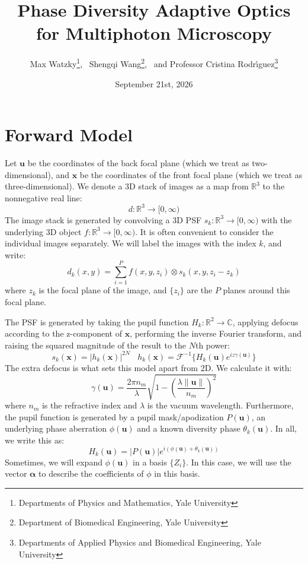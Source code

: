 \documentclass{article}
\title{Phase Diversity Adaptive Optics for Multiphoton Microscopy}
\author{ Max Watzky\footnote{Departments of Physics and Mathematics, Yale University}, \ Shengqi Wang\footnote{Department of Biomedical Engineering, Yale University}, \ and Professor Cristina Rodr\'{\i}guez\footnote{Departments of Applied Physics and Biomedical Engineering, Yale University}}
\date{September 21st, 2026}
\begin{document}
\maketitle

\section{Forward Model}
Let $\mathbf{u}$ be the coordinates of the back focal plane (which we treat as two-dimensional), and
$\mathbf{x}$ be the coordinates of the front focal plane (which we treat as three-dimensional). We denote a 3D stack of images as a map from $\mathbb{R}^3$ to the nonnegative real line:
\begin{equation}
d: \mathbb{R}^3 \to [0, \infty)
\end{equation}
The image stack is generated by convolving a 3D PSF $s_k: \mathbb{R}^3 \to [0, \infty)$ with the underlying 3D object $f: \mathbb{R}^3 \to [0, \infty)$. It is often convenient to consider the individual images separately. We will label the images with the index $k$, and write:
\begin{equation}
d_k(x, y) = \sum_{i=1}^P f(x, y, z_i) \otimes s_k(x, y, z_i - z_k)
\end{equation}
where $z_k$ is the focal plane of the image, and $\{z_i\}$ are the $P$ planes around this focal plane.

The PSF is generated by taking the pupil function $H_k: \mathbb{R}^2 \to \mathbb{C}$, applying defocus according to the z-component of $\mathbf{x}$, performing the inverse Fourier transform, and raising the squared magnitude of the result to the $N$th power:
\begin{equation}
s_k(\mathbf{x}) = |h_k(\mathbf{x})|^{2N}  \ \ \ \ h_k(\mathbf{x}) = \mathcal{F}^{-1} \{H_k(\mathbf{u}) e^{i z \gamma(\mathbf{u})}\}
\end{equation}
The extra defocus is what sets this model apart from 2D. We calculate it with:
\begin{equation}
\gamma(\mathbf{u}) = \frac{2\pi n_m}{\lambda} \sqrt{1-  \left(\frac{\lambda \|\mathbf{u}\|}{n_m} \right)^2}
\end{equation}
where $n_m$ is the refractive index and $\lambda$ is the vacuum wavelength.
Furthermore, the pupil function is generated by a pupil mask/apodization $P(\mathbf{u})$, an underlying phase aberration $\phi(\mathbf{u})$ and a known diversity phase $\theta_k(\mathbf{u})$. In all, we write this as:
\begin{equation}
H_k(\mathbf{u}) = |P(\mathbf{u})| e^{i \left(\phi(\mathbf{u}) +  \theta_k(\mathbf{u})\right)}
\end{equation}
Sometimes, we will expand $\phi(\mathbf{u})$ in a basis $\{ Z_i\}$. In this case, we will use the vector $\bm{\alpha}$ to describe the coefficients of $\phi$ in this basis.
\end{document}
